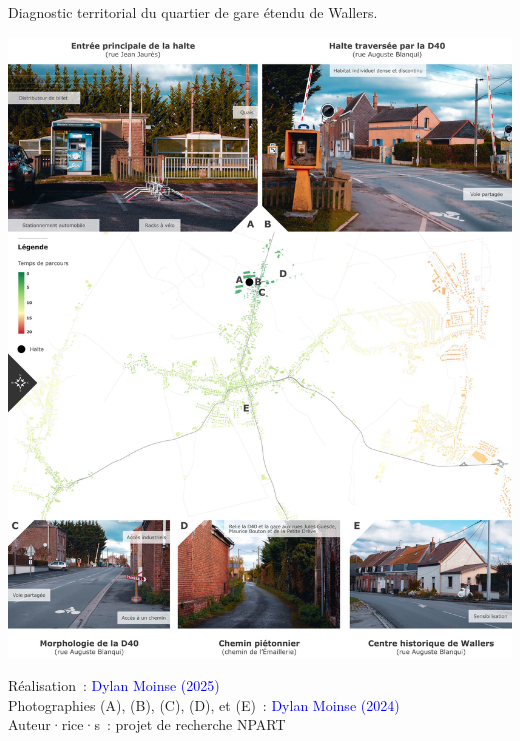 \begin{refsegment}
    \begin{carte}[h!]\vspace*{4pt}
        \caption{Diagnostic territorial du quartier de gare étendu de Wallers.}
        \label{fig-chap6:monographie-wallers}
        \centerline{\includegraphics[width=1\columnwidth]{src/Figures/Chap-6/FR_NPART_Wallers.jpg}}
        \vspace{5pt}
        \begin{flushright}\scriptsize{
        Réalisation~: \textcolor{blue}{Dylan Moinse (2025)}
        \\
        Photographies (A), (B), (C), (D), et (E)~: \textcolor{blue}{Dylan Moinse (2024)}
        \\
        Auteur·rice·s~: projet de recherche \acrshort{NPART}
        }\end{flushright}
    \end{carte}


\end{refsegment}
